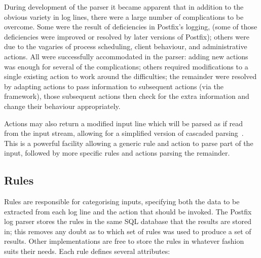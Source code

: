 \documentclass[draft]{svmult}
\begin{document}
\label{complications}

During development of the parser it became apparent that in addition to the
obvious variety in log lines, there were a large number of complications to
be overcome.  Some were the result of deficiencies in Postfix's logging,
(some of those deficiencies were improved or resolved by later versions of
Postfix); others were due to the vagaries of process scheduling, client
behaviour, and administrative actions.  All were successfully accommodated
in the parser: adding new actions was enough for several of the
complications; others required modifications to a single existing action to
work around the difficulties; the remainder were resolved by adapting
actions to pass information to subsequent actions (via the framework),
those subsequent actions then check for the extra information and change
their behaviour appropriately.

Actions may also return a modified input line which will be parsed as if
read from the input stream, allowing for a simplified version of cascaded
parsing~\cite{cascaded-parsing}.  This is a powerful facility allowing a
generic rule and action to parse part of the input, followed by more
specific rules and actions parsing the remainder.

\subsection{Rules}

\label{Rules}

Rules are responsible for categorising inputs, specifying both the data to
be extracted from each log line and the action that should be invoked.  The
Postfix log parser stores the rules in the same SQL database that the
results are stored in; this removes any doubt as to which set of rules was
used to produce a set of results.  Other implementations are free to store
the rules in whatever fashion suits their needs.  Each rule defines several
attributes:
\end{document}
